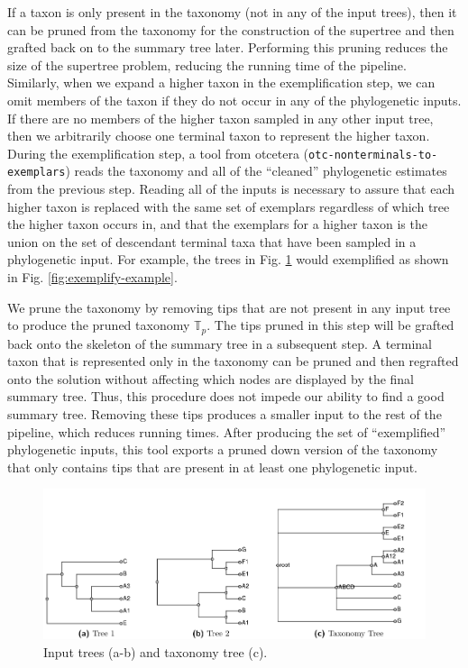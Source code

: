\documentclass[fleqn,12pt,lineno,english]{wlpeerj}
\begin{document}
If a taxon is only present in the taxonomy (not in any of the input
trees), then it can be pruned from the taxonomy for the construction
of the supertree and then grafted back on to the summary tree later.
Performing this pruning reduces the size of the supertree problem,
reducing the running time of the pipeline. Similarly, when we expand
a higher taxon in the exemplification step, we can omit members of
the taxon if they do not occur in any of the phylogenetic inputs.
If there are no members of the higher taxon sampled in any other input
tree, then we arbitrarily choose one terminal taxon to represent the
higher taxon. During the exemplification step, a tool from otcetera
(\texttt{otc-nonterminals-to-exemplars}) reads the taxonomy and all
of the ``cleaned'' phylogenetic estimates from the previous step.
Reading all of the inputs is necessary to assure that each higher
taxon is replaced with the same set of exemplars regardless of which
tree the higher taxon occurs in, and that the exemplars for a higher
taxon is the union on the set of descendant terminal taxa that have
been sampled in a phylogenetic input. For example, the trees in Fig.
\ref{fig:cleaned-phylo-example} would exemplified as shown in Fig.
\ref{fig:exemplify-example}.

We prune the taxonomy by removing tips that are not present in any
input tree to produce the pruned taxonomy $\mathbb{T}_{p}$. The tips
pruned in this step will be grafted back onto the skeleton of the
summary tree in a subsequent step. A terminal taxon that is represented
only in the taxonomy can be pruned and then regrafted onto the solution
without affecting which nodes are displayed by the final summary tree.
Thus, this procedure does not impede our ability to find a good summary
tree. Removing these tips produces a smaller input to the rest of
the pipeline, which reduces running times. After producing the set
of ``exemplified'' phylogenetic inputs, this tool exports a pruned
down version of the taxonomy that only contains tips that are present
in at least one phylogenetic input.

\begin{figure}
\includegraphics[width=1.0\textwidth]{Fig4}

\caption{Input trees (a-b) and taxonomy tree (c).}
\label{fig:cleaned-phylo-example}
\end{figure}
 
\end{document}

